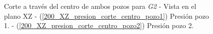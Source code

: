 \documentclass[10pt,a4paper,final]{article}
\begin{document}
\begin{figure}[tbhp]
   \centering
   \hspace{0.1\linewidth}
    \caption{Corte a través del centro de ambos pozos para \emph{G2} - Vista en el plano XZ - (\ref{200_XZ_presion_corte_centro_pozo1}) Presión pozo 1. - (\ref{200_XZ_presion_corte_centro_pozo2})  Presión pozo 2.}
   \label{200_XZ_presion_corte_centro}                %
\end{figure}
\end{document}
